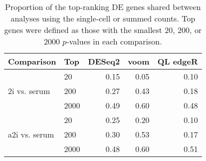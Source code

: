 \documentclass[oupdraft]{bio}
\begin{document}
\begin{table}[!p]
\caption{Proportion of the top-ranking DE genes shared between analyses using the single-cell or summed counts.
Top genes were defined as those with the smallest 20, 200, or 2000 $p$-values in each comparison.
}
\label{tab:realrank}
\begin{center}
\begin{tabular}{l l r r r}
\hline
\textbf{Comparison} & \textbf{Top} & \textbf{DESeq2} & \textbf{voom} & \textbf{QL edgeR} \\
\hline
\multirow{3}{*}{2i vs. serum} 
& 20 & 0.15 & 0.05 & 0.10 \\
& 200 & 0.27 & 0.43 & 0.18 \\
& 2000 & 0.49 & 0.60 & 0.48 \\
\hline
\multirow{3}{*}{a2i vs. serum} 
& 20 & 0.25 & 0.20 & 0.10 \\
& 200 & 0.30 & 0.53 & 0.17 \\
& 2000 & 0.48 & 0.60 & 0.51 \\
\hline
\end{tabular}
\end{center}
\end{table}
\end{document}

